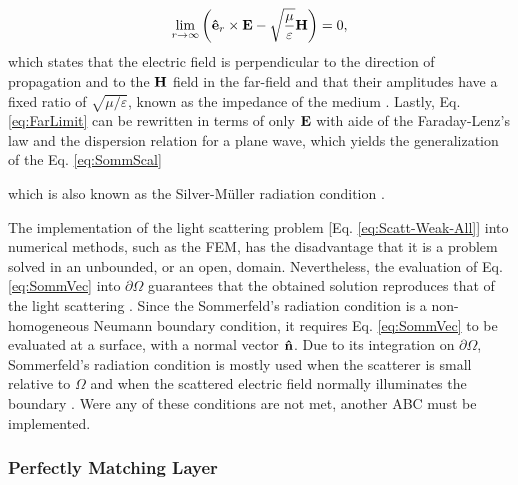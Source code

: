 %
\begin{align}
    \lim_{r\to\infty} \qty(\vu{e}_r\times\vb{E} - \sqrt{\frac{\mu}{\varepsilon}} \vb{H}) = 0,
    \label{eq:FarLimit}
\end{align}
%
%
%
which states that the electric field is perpendicular to the direction of propagation and to the $\vb{H}$ field in the far-field and that their amplitudes have a fixed ratio of $\sqrt{{\mu}/{\varepsilon}}$, known as the impedance of the medium \cite{jin_theory_2010,schot_eighty_1992}. Lastly, Eq. \eqref{eq:FarLimit} can be rewritten in terms of only $\vb{E}$ with aide of the Faraday-Lenz's law and the dispersion relation for a plane wave, which yields the generalization of the Eq. \eqref{eq:SommScal}
%
%
%
%
%
 \noindent%
which is also known as the Silver-Müller radiation condition \cite{colton_inverse_2019,silver_microwave_1984}.

The implementation of the light scattering problem [Eq. \eqref{eq:Scatt-Weak-All}] into numerical methods, such as the FEM, has the disadvantage that it is a problem solved in an unbounded, or an open, domain. Nevertheless, the evaluation of Eq. \eqref{eq:SommVec} into $\partial\Omega$ guarantees that the obtained solution reproduces that of the light scattering \cite{jin_theory_2010,bondeson_computational_2005}. Since the Sommerfeld's radiation  condition is a non-homogeneous Neumann boundary condition, it  requires Eq. \eqref{eq:SommVec} to be evaluated at a surface, with a normal vector $\vu{n}$. Due to its integration on $\partial\Omega$, Sommerfeld's radiation condition is mostly used when the scatterer  is small relative to  $\Omega$ and when the scattered electric field normally illuminates the boundary \cite{jin_theory_2010,bondeson_computational_2005}.  Were any of these conditions are not met, another ABC must be implemented.

    \subsubsection{Perfectly Matching Layer}


